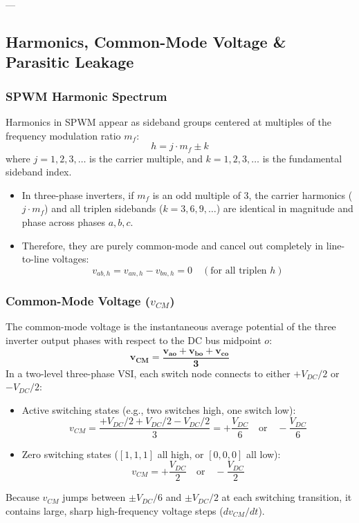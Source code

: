 ---

\subsection{Harmonics, Common-Mode Voltage \& Parasitic Leakage}

\subsubsection{SPWM Harmonic Spectrum}
Harmonics in SPWM appear as sideband groups centered at multiples of the frequency modulation ratio $m_f$:
\begin{equation}
h = j \cdot m_f \pm k
\end{equation}
where $j = 1, 2, 3, \dots$ is the carrier multiple, and $k = 1, 2, 3, \dots$ is the fundamental sideband index.
\begin{itemize}
  \item In three-phase inverters, if $m_f$ is an odd multiple of 3, the carrier harmonics ($j \cdot m_f$) and all triplen sidebands ($k = 3, 6, 9, \dots$) are identical in magnitude and phase across phases $a, b, c$.
  \item Therefore, they are purely common-mode and cancel out completely in line-to-line voltages:
  \begin{equation}
  v_{ab,h} = v_{an,h} - v_{bn,h} = 0 \quad (\text{for all triplen } h)
  \end{equation}
\end{itemize}

\subsubsection{Common-Mode Voltage ($v_{CM}$)}
The common-mode voltage is the instantaneous average potential of the three inverter output phases with respect to the DC bus midpoint $o$:
\begin{equation}
\label{eq:vcm_def}
\mathbf{v_{CM} = \frac{v_{ao} + v_{bo} + v_{co}}{3}}
\end{equation}
In a two-level three-phase VSI, each switch node connects to either $+V_{DC}/2$ or $-V_{DC}/2$:
\begin{itemize}
  \item Active switching states (e.g., two switches high, one switch low):
  \begin{equation}
  v_{CM} = \frac{+V_{DC}/2 + V_{DC}/2 - V_{DC}/2}{3} = +\frac{V_{DC}}{6} \quad \text{or} \quad -\frac{V_{DC}}{6}
  \end{equation}
  \item Zero switching states ($[1,1,1]$ all high, or $[0,0,0]$ all low):
  \begin{equation}
  v_{CM} = +\frac{V_{DC}}{2} \quad \text{or} \quad -\frac{V_{DC}}{2}
  \end{equation}
\end{itemize}
Because $v_{CM}$ jumps between $\pm V_{DC}/6$ and $\pm V_{DC}/2$ at each switching transition, it contains large, sharp high-frequency voltage steps ($dv_{CM}/dt$).

